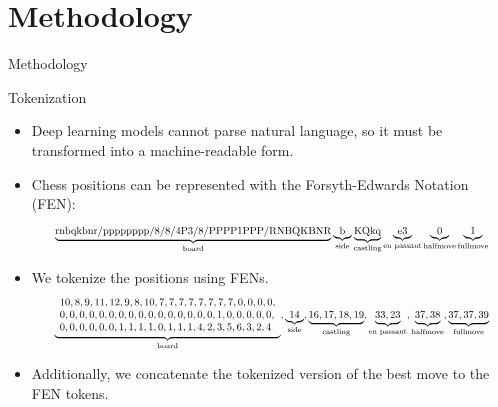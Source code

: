 \documentclass[normaltitle,first=orange,second=red,leqno]{aaltoslides}
\newcommand{\thesiscolor}{orange}
\begin{document}
    


\section{Methodology}

\begin{frame}
\begin{center}
\Huge{\color{\thesiscolor} Methodology}
\end{center}
\end{frame}

\begin{frame}{Tokenization}
    \begin{itemize}
        \item<1-> Deep learning models cannot parse natural language, so it must be transformed into a machine-readable form.
        \item<2-> Chess positions can be represented with the Forsyth-Edwards Notation (FEN):
        \begin{equation*}
            \resizebox{0.9\textwidth}{!}{$
                \underbrace{\text{rnbqkbnr/pppppppp/8/8/4P3/8/PPPP1PPP/RNBQKBNR}}_{\text{board}} \underbrace{\text{b}}_{\text{side}} \underbrace{\text{KQkq}}_{\text{castling}} \underbrace{\text{e3}}_{\text{en passant}} \underbrace{0}_{\text{halfmove}} \underbrace{1}_{\text{fullmove}}
            $}
        \end{equation*}
        \item<3-> We tokenize the positions using FENs.
        \begin{equation*}
            \resizebox{0.9\textwidth}{!}{$
                \underbrace{
                    \begin{array}{l}
                        10, 8, 9, 11, 12, 9, 8, 10, 7, 7, 7, 7, 7, 7, 7, 7, 0, 0, 0, 0, \\
                        0, 0, 0, 0, 0, 0, 0, 0, 0, 0, 0, 0, 0, 0, 0, 0, 1, 0, 0, 0, 0, 0, \\
                        0, 0, 0, 0, 0, 0, 1, 1, 1, 1, 0, 1, 1, 1, 4, 2, 3, 5, 6, 3, 2, 4
                    \end{array}
                }_{\text{board}}, \underbrace{14}_{\text{side}}, \underbrace{16, 17, 18, 19}_{\text{castling}}, \underbrace{33, 23}_{\text{en passant}}, \underbrace{37, 38}_{\text{halfmove}}, \underbrace{37, 37, 39}_{\text{fullmove}}
            $}
        \end{equation*}
        \item<4-> Additionally, we concatenate the tokenized version of the best move to the FEN tokens.
    \end{itemize}
\end{frame}
\end{document}
